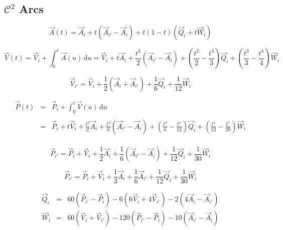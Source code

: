 \documentclass[aps,12pt]{revtex4}
\begin{document}
\subsection{$\mathcal{C}^2$ Arcs}

\begin{equation}
	\vec{A}(t) = \vec{A}_i + t\left(\vec{A}_{i'}-\vec{A}_{i}\right) + t(1-t)(\vec{Q}_i+t\vec{W}_i)
\end{equation}

\begin{equation}
	\vec{V}(t) =  \vec{V}_i + \int_0^t \vec{A}(u) \, \mathrm{d} u 
	= \vec{V}_i + t \vec{A}_i + \frac{t^2}{2} \left(\vec{A}_{i'}-\vec{A}_{i}\right) 
	+ \left(\frac{t^2}{2} - \frac{t^3}{3}\right)  \vec{Q}_i 
	+ \left(\frac{t^3}{3} - \frac{t^4}{4}\right)  \vec{W}_i
	\end{equation}

\begin{equation}
\label{eq:v}
\boxed{
	\vec{V}_{i'} = \vec{V}_i + \frac{1}{2} \left( \vec{A}_{i}+\vec{A}_{i'}\right) + \frac{1}{6}\vec{Q}_i + \frac{1}{12}\vec{W}_i
	}
\end{equation}

\begin{equation}
\begin{array}{rcl}
	\vec{P}(t) &=& \displaystyle \vec{P}_i + \int_0^t \vec{V}(u) \, \mathrm{d} u \\
	\\
	& = & \displaystyle \vec{P}_i + t \vec{V}_i + \frac{t^2}{2} \vec{A}_i + \frac{t^3}{6}  \left(\vec{A}_{i'}-\vec{A}_{i}\right) 
	+ \left(\frac{t^3}{6} - \frac{t^4}{12}\right)  \vec{Q}_i +  \left(\frac{t^4}{12} - \frac{t^5}{20}\right) \vec{W}_i\\
\end{array}
\end{equation}

\begin{equation}
	\vec{P}_{i'} = \vec{P}_i + \vec{V}_i + \frac{1}{2} \vec{A}_i + \frac{1}{6} \left(\vec{A}_{i'}-\vec{A}_{i}\right) + \frac{1}{12} \vec{Q}_i + \frac{1}{30} \vec{W}_i
\end{equation}

\begin{equation}
\label{eq:p}
\boxed{
	\vec{P}_{i'} = \vec{P}_i + \vec{V}_i + \frac{1}{3} \vec{A}_i + \frac{1}{6}  \vec{A}_{i'}  + \frac{1}{12} \vec{Q}_i + \frac{1}{30} \vec{W}_i
	}
\end{equation}

\begin{equation}
\begin{array}{rcl}
	\vec{Q}_i & = & 60\left(\vec{P}_{i'}-\vec{P}_i\right) - 6\left(6\vec{V}_i+4\vec{V}_{i'}\right) - 2 \left(4\vec{A}_{i}-\vec{A}_{i'}\right)  \\
	\vec{W}_i & = & 60\left(\vec{V}_i+\vec{V}_{i'}\right) - 120 \left(\vec{P}_{i'}-\vec{P}_i\right) -10\left(\vec{A}_{i'} - \vec{A}_{i}\right) \\
\end{array}
\end{equation}
\end{document}
